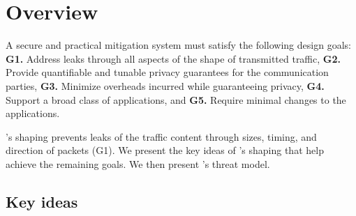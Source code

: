 \section{Overview}
\label{sec:overview}




A secure and practical {\nsca} mitigation system must satisfy the following
design goals:
{\bf G1.} Address leaks through all aspects of the shape of transmitted traffic,
{\bf G2.} Provide quantifiable and tunable privacy guarantees for the
communication parties,
{\bf G3.} Minimize overheads incurred while guaranteeing privacy,
{\bf G4.} Support a broad class of applications, and
{\bf G5.} Require minimal changes to the applications.

{\sys}'s shaping prevents leaks of the traffic content through sizes, timing,
and direction of packets  (G1).
%
We present the key ideas of {\sys}'s shaping that help achieve the remaining
goals. We then present {\sys}'s threat model.

\subsection{Key ideas}
\label{subsec:key-ideas}

